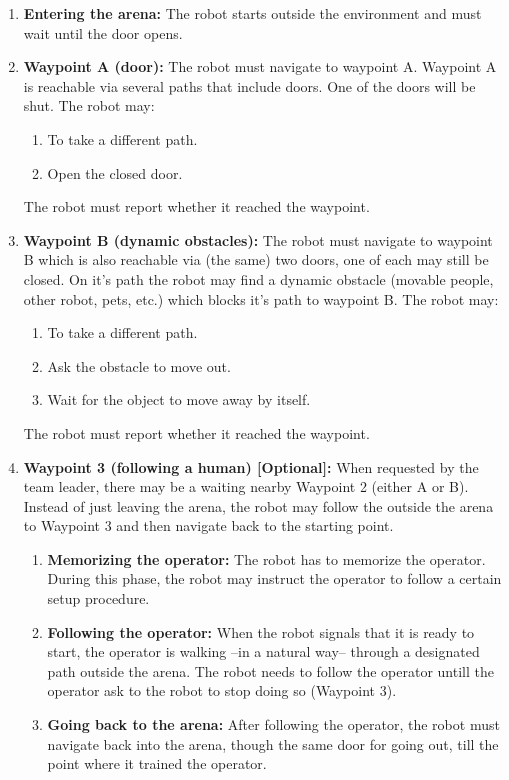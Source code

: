 \begin{enumerate}
\item \textbf{Entering the arena:} The robot starts outside the environment and must wait until the door opens.
\item \textbf{Waypoint A (door):} The robot must navigate to waypoint A. Waypoint A is reachable via several paths that include doors. One of the doors will be shut. The robot may:
\begin{enumerate}
\item To take a different path.
\item Open the closed door.
\end{enumerate}
The robot must report whether it reached the waypoint.

\item \textbf{Waypoint B (dynamic obstacles):} The robot must navigate to waypoint B which is also reachable via (the same) two doors, one of each may still be closed. On it's path the robot may find a dynamic obstacle (movable people, other robot, pets, etc.) which blocks it's path to waypoint B. The robot may:
\begin{enumerate}
\item To take a different path.
\item Ask the obstacle to move out.
\item Wait for the object to move away by itself.
\end{enumerate}
The robot must report whether it reached the waypoint.

\item \textbf{Waypoint 3 (following a human) [Optional]:} When requested by the team leader, there may be a  waiting nearby Waypoint 2 (either A or B). Instead of just leaving the arena, the robot may follow the  outside the arena to Waypoint 3 and then navigate back to the starting point.

\begin{enumerate}
\item \textbf{Memorizing the operator:} The robot has to memorize the operator. During this phase, the robot may instruct the operator to follow a certain setup procedure.
\item \textbf{Following the operator:} When the robot signals that it is ready to start, the operator is walking --in a natural way-- through a designated path outside the arena. The robot needs to follow the operator untill the operator ask to the robot to stop doing so (Waypoint 3).
\item \textbf{Going back to the arena:} After following the operator, the robot must navigate back into the arena, though the same door for going out, till the point where it trained the operator.
\end{enumerate}


\end{enumerate}
